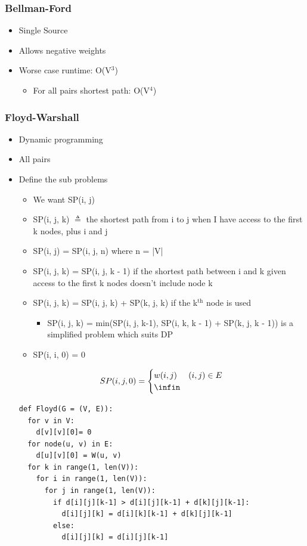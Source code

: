 \documentclass[11pt]{article}
\begin{document}
\subsubsection*{Bellman-Ford}
\label{sec:org2f385ad}
\begin{itemize}
\item Single Source
\item Allows negative weights
\item Worse case runtime: O(V\(^{\text{3}}\))
\begin{itemize}
\item For all pairs shortest path: O(V\(^{\text{4}}\))
\end{itemize}
\end{itemize}
\subsubsection*{Floyd-Warshall}
\label{sec:org0b973a9}
\begin{itemize}
\item Dynamic programming
\item All pairs
\item Define the sub problems
\begin{itemize}
\item We want SP(i, j)
\item SP(i, j, k) \(\triangleq\) the shortest path from i to j when I have access to the first k nodes, plus i and j
\item SP(i, j) = SP(i, j, n) where n = |V|
\item SP(i, j, k) = SP(i, j, k - 1) if the shortest path between i and k given access to the first k nodes doesn't include node k
\item SP(i, j, k) = SP(i, j, k) + SP(k, j, k) if the k\(^{\text{th}}\) node is used
\begin{itemize}
\item SP(i, j, k) = min(SP(i, j, k-1), SP(i, k, k - 1) + SP(k, j, k - 1)) is a simplified problem which suits DP
\end{itemize}
\item SP(i, i, 0) = 0
\end{itemize}
\[
        SP(i, j, 0) = \begin{cases} 
          w(i, j) & (i, j)\in{}E \\
          \infin \\
        \end{cases}
      \]
\begin{verbatim}
def Floyd(G = (V, E)):
  for v in V:
    d[v][v][0]= 0
  for node(u, v) in E:
    d[u][v][0] = W(u, v)
  for k in range(1, len(V)):
    for i in range(1, len(V)):
      for j in range(1, len(V)):
        if d[i][j][k-1] > d[i][j][k-1] + d[k][j][k-1]:
          d[i][j][k] = d[i][k][k-1] + d[k][j][k-1]
        else:
          d[i][j][k] = d[i][j][k-1]
\end{verbatim}
\end{itemize}
\end{document}
